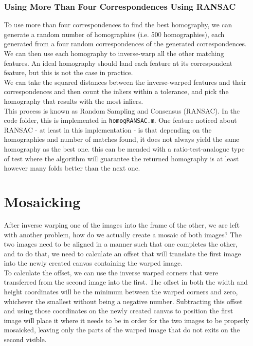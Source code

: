 \documentclass[10pt,twocolumn,letterpaper]{article}
\begin{document}
\subsubsection{Using More Than Four Correspondences Using RANSAC}
To use more than four correspondences to find the best homography, we can generate a random number of homographies (i.e. 500 homographies), each generated from a four random correspondences of the generated correspondences. We can then use each homography to inverse-warp all the other matching features. An ideal homography should land each feature at its correspondent feature, but this is not the case in practice.\\
We can take the squared distances between the inverse-warped features and their correspondences and then count the inliers within a tolerance, and pick the homography that results with the most inliers.\\
This process is known as Random Sampling and Consensus (RANSAC). In the code folder, this is implemented in \texttt{homogRANSAC.m}. One feature noticed about RANSAC - at least in this implementation - is that depending on the homographies and number of matches found, it does not always yield the same homography as the best one. this can be mended with a ratio-test-analogue type of test where the algorithm will guarantee the returned homography is at least however many folds better than the next one.
\section{Mosaicking}
After inverse warping one of the images into the frame of the other, we are left with another problem, how do we actually create a mosaic of both images?
The two images need to be aligned in a manner such that one completes the other, and to do that, we need to calculate an offset that will translate the first image into the newly created canvas containing the warped image.\\
To calculate the offset, we can use the inverse warped corners that were transferred from the second image into the first. The offset in both the width and height coordinates will be the minimum between the warped corners and zero, whichever the smallest without being a negative number. Subtracting this offset and using those coordinates on the newly created canvas to position the first image will place it where it needs to be in order for the two images to be properly mosaicked, leaving only the parts of the warped image that do not exits on the second visible.
\end{document}
